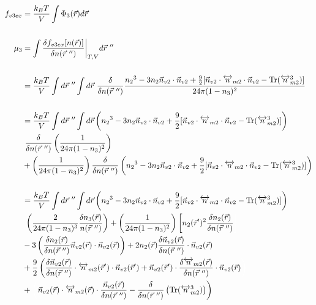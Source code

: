 \documentclass[double,12pt]{beavtex}
\begin{document}
\begin{align}
  f_{v3ex} &= \frac{k_BT}{V}\int \Phi_3(\vec r) d\vec r  \\ 
  \nonumber\\ 
  \mu_3 &= \int \frac{\delta f_{v3ex}[n(\vec r)]}{\delta n(\vec r~'')}
  \bigg|_{T,V} d\vec r~'' \\ \nonumber \\
%
   &= \frac{k_BT}{V}\int d\vec r~''\int d\vec r~\frac{\delta}{\delta 
    n(\vec r~'')}\frac{{n_2}^3-3n_2\vec{n}_{v2}\cdot\vec{n}_{v2}+\frac{9}{2}
    [\vec{n}_{v2}\cdot{\overleftrightarrow{n}_{m2}}\cdot{\vec{n}_{v2}}
    -\operatorname{Tr}({\overleftrightarrow{n}^3_{m2}})]}{24\pi(1-n_3)^2}
     \nonumber \\ \\
%
     &=\frac{k_BT}{V}\int d\vec r~''\int d\vec r \left( {n_2}^3-3n_2
     \vec{n}_{v2}\cdot\vec{n}_{v2} 
     +\frac{9}{2}[\vec{n}_{v2}\cdot{\overleftrightarrow{n}_{m2}}\cdot{
     \vec{n}_{v2}}-\operatorname{Tr}({\overleftrightarrow{n}^3_{m2}})]
     \right) \nonumber\\
      &~ \frac{\delta}{\delta n(\vec r~'')}\left(\frac{1}{24\pi(1-n_3)^2}
      \right) \nonumber\\
     &+ \left(\frac{1}{24\pi(1-n_3)^2}\right)\frac{\delta}
     {\delta n(\vec r~'')}\left({n_2}^3-3n_2\vec{n}_{v2}\cdot\vec{n}_{v2}
     +\frac{9}{2}[\vec{n}_{v2}\cdot{\overleftrightarrow{n}_{m2}}\cdot{
     \vec{n}_{v2}}-\operatorname{Tr}({\overleftrightarrow{n}^3_{m2}})]
     \right) \\ \nonumber \\
%
    &=\frac{k_BT}{V}\int d\vec r~''\int d\vec r\left( {n_2}^3-3n_2
    \vec{n}_{v2}\cdot\vec{n}_{v2} 
     +\frac{9}{2}[\vec{n}_{v2}\cdot{\overleftrightarrow{n}_{m2}}\cdot{
     \vec{n}_{v2}}-\operatorname{Tr}({\overleftrightarrow{n}^3_{m2}})]
     \right) \nonumber\\
     &~\left(\frac{2}{24\pi(1-n_3)^3}\frac{\delta n_3(\vec r)}{n(\vec r~'')}
     \right) 
     + \left(\frac{1}{24\pi(1-n_3)^2}\right)\left[n_2(\vec r')^2
     \frac{\delta n_2(\vec r)}{\delta n(\vec r~'')} \color{white}\right]
      \nonumber\\
     &- 3\left(\frac{\delta n_{2}(\vec r)}{\delta n(\vec r~'')}\vec n_{v2}
     (\vec r) \cdot \vec n_{v2}(\vec r)\right) + 2n_2(\vec r)\frac{\delta
     \vec n_{v2}(\vec r)}{\delta n(\vec r~'')}\cdot \vec n_{v2}(\vec r) 
     \nonumber\\
     &+\frac{9}{2}\left(\frac{\delta \vec n_{v2}(\vec r)}{\delta n(\vec r~'')}
     \cdot \overleftrightarrow n_{m2}(\vec r')\cdot \vec n_{v2}( \vec r')
     +\vec n_{v2}(\vec r')\cdot \frac{\delta \overleftrightarrow n_{m2}
     (\vec r)}{\delta n(\vec r~'')}\cdot \vec n_{v2}( \vec r)\color{white}
     \right)\nonumber\\
     &+ \color{white}\left(\color{black}\vec n_{v2}( \vec r)\cdot 
     \overleftrightarrow n_{m2}(\vec r)
     \cdot \frac{\vec n_{v2}( \vec r)}{\delta n(\vec r~'')}-
     \frac{\delta}{\delta n(\vec r~'')}\left(\operatorname{Tr}
     ({\overleftrightarrow{n}^3_{m2}})\right)\right) 
%
\end{align} 
\end{document}
